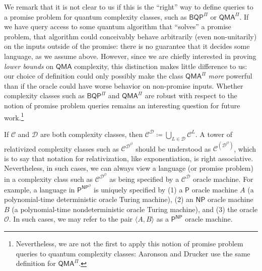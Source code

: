 \documentclass[11pt]{article}%
\begin{document}
We remark that it is not clear to us if this is the ``right'' way to define queries to a promise problem for quantum complexity classes, such as $\mathsf{BQP}^\Pi$ or $\mathsf{QMA}^\Pi$. If we have query access to some quantum algorithm that ``solves'' a promise problem, that algorithm could conceivably behave arbitrarily (even non-unitarily) on the inputs outside of the promise: there is no guarantee that it decides some language, as we assume above. However, since we are chiefly interested in proving \textit{lower bounds} on $\mathsf{QMA}$ complexity, this distinction makes little difference to us: our choice of definition could only possibly make the class $\mathsf{QMA}^\Pi$ \textit{more} powerful than if the oracle could have worse behavior on non-promise inputs. Whether complexity classes such as $\mathsf{BQP}^\Pi$ and $\mathsf{QMA}^\Pi$ are robust with respect to the notion of promise problem queries remains an interesting question for future work.\footnote{Nevertheless, we are not the first to apply this notion of promise problem queries to quantum complexity classes: Aaronson and Drucker \cite{AD14} use the same definition for $\mathsf{QMA}^\Pi$.}

If $\mathcal{C}$ and $\mathcal{D}$ are both complexity classes, then $\mathcal{C}^\mathcal{D} \coloneqq \bigcup_{L \in \mathcal{D}} \mathcal{C}^L$. A tower of relativized complexity classes such as $\mathcal{C}^{\mathcal{D}^\mathcal{O}}$ should be understood as $\mathcal{C}^{\left(\mathcal{D}^\mathcal{O}\right)}$, which is to say that notation for relativization, like exponentiation, is right associative. Nevertheless, in such cases, we can always view a language (or promise problem) in a complexity class such as $\mathcal{C}^{\mathcal{D}^\mathcal{O}}$ as being specified by a $\mathcal{C}^\mathcal{D}$ oracle machine. For example, a language in $\mathsf{P}^{\mathsf{NP}^\mathcal{O}}$ is uniquely specified by (1) a $\mathsf{P}$ oracle machine $A$ (a polynomial-time deterministic oracle Turing machine), (2) an $\mathsf{NP}$ oracle machine $B$ (a polynomial-time nondeterministic oracle Turing machine), and (3) the oracle $\mathcal{O}$. In such cases, we may refer to the pair $\langle A, B \rangle$ as a $\mathsf{P}^\mathsf{NP}$ oracle machine.
\end{document}
